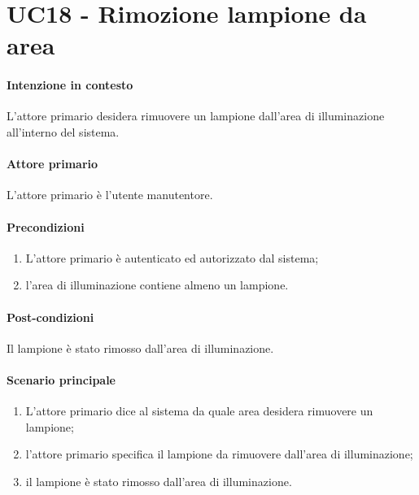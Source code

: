 \section{UC18 - Rimozione lampione da area}\label{uc:18}
\paragraph{Intenzione in contesto} L'attore primario desidera rimuovere un lampione dall'area di illuminazione all'interno del sistema.
\paragraph{Attore primario} L'attore primario è l'utente manutentore.
\paragraph{Precondizioni}  
\begin{enumerate}
    \item L'attore primario è autenticato ed autorizzato dal sistema;
    \item l'area di illuminazione contiene almeno un lampione.
\end{enumerate}
\paragraph{Post-condizioni} Il lampione è stato rimosso dall'area di illuminazione.
\paragraph{Scenario principale}
\begin{enumerate}
    \item L'attore primario dice al sistema da quale area desidera rimuovere un lampione;
    \item l'attore primario specifica il lampione da rimuovere dall'area di illuminazione;
    \item il lampione è stato rimosso dall'area di illuminazione.
\end{enumerate}